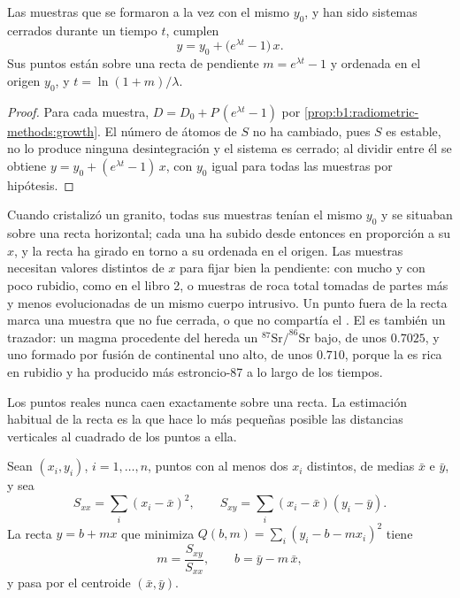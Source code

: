 \begin{theorem}[La isócrona]\label{thm:b1:radiometric-methods:isochron}
Las muestras que se formaron a la vez con el mismo  $y_0$, y han sido sistemas cerrados durante un tiempo $t$,
cumplen
\[
  y = y_0 + \bigl(e^{\lambda t} - 1\bigr)\,x .
\]
Sus puntos están sobre una recta de pendiente $m = e^{\lambda t} - 1$ y ordenada en el origen $y_0$, y $t = \ln(1+m)/\lambda$.
\end{theorem}

\begin{proof}
Para cada muestra, $D = D_0 + P\,(e^{\lambda t} - 1)$ por
\cref{prop:b1:radiometric-methods:growth}. El número de átomos de $S$ no ha cambiado, pues $S$ es estable, no lo produce ninguna desintegración y el sistema es cerrado;
al dividir entre él se obtiene $y = y_0 + (e^{\lambda t} - 1)\,x$, con $y_0$ igual para todas las muestras por hipótesis.
\end{proof}

Cuando cristalizó un granito, todas sus muestras tenían el mismo $y_0$ y se situaban sobre una recta horizontal; cada una ha subido desde entonces en proporción a su $x$, y la recta ha girado en torno a su ordenada en el origen. Las muestras necesitan valores distintos de $x$ para
fijar bien la pendiente:  con mucho y con poco rubidio, como en el libro 2, o muestras de roca total tomadas de partes más y menos evolucionadas de un mismo cuerpo intrusivo. Un punto fuera de la recta marca una muestra que no fue cerrada, o que no compartía el . El  es también un trazador: un magma procedente del  hereda un $^{87}\mathrm{Sr}/^{86}\mathrm{Sr}$ bajo, de unos $0.7025$, y uno formado por fusión de  continental uno alto, de unos $0.710$, porque la  es rica en rubidio y ha producido más estroncio-87 a lo largo de los tiempos.

Los puntos reales nunca caen exactamente sobre una recta. La estimación habitual de la recta es la que hace lo más pequeñas posible las distancias verticales al cuadrado de los puntos a ella.

\begin{proposition}\label{prop:b1:radiometric-methods:lsq}
Sean $(x_i, y_i)$, $i = 1, \dots, n$, puntos con al menos dos $x_i$ distintos, de medias $\bar x$ e $\bar y$, y sea
\[
  S_{xx} = \sum_i (x_i - \bar x)^2, \qquad S_{xy} = \sum_i (x_i - \bar x)(y_i - \bar y).
\]
La recta $y = b + m x$ que minimiza $Q(b, m) = \sum_i (y_i - b - m x_i)^2$ tiene
\[
  m = \frac{S_{xy}}{S_{xx}}, \qquad b = \bar y - m\,\bar x ,
\]
y pasa por el centroide $(\bar x, \bar y)$.
\end{proposition}


